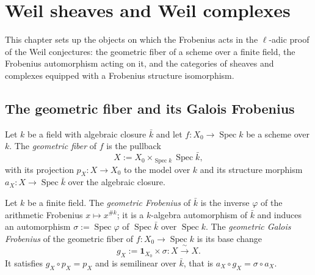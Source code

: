 \chapter{Weil sheaves and Weil complexes}\label{chap:weil-sheaves}

This chapter sets up the objects on which the Frobenius acts in the \(\ell\)-adic
proof of the Weil conjectures: the geometric fiber of a scheme over a finite
field, the Frobenius automorphism acting on it, and the categories of sheaves and
complexes equipped with a Frobenius structure isomorphism.

\section{The geometric fiber and its Galois Frobenius}

\begin{definition}\label{def:weil-geometric-fiber}
\leanok
Let \(k\) be a field with algebraic closure \(\bar k\) and let \(f\colon X_0\to
\operatorname{Spec}k\) be a scheme over \(k\).  The \emph{geometric fiber} of
\(f\) is the pullback
\[
 X:=X_0\times_{\operatorname{Spec}k}\operatorname{Spec}\bar k,
\]
with its projection \(p_X\colon X\to X_0\) to the model over \(k\) and its
structure morphism \(a_X\colon X\to\operatorname{Spec}\bar k\) over the algebraic
closure.
\end{definition}

\begin{definition}\label{def:weil-galois-frobenius}
\leanok
Let \(k\) be a finite field.  The \emph{geometric Frobenius} of \(\bar k\) is the
inverse \(\varphi\) of the arithmetic Frobenius \(x\mapsto x^{\#k}\); it is a
\(k\)-algebra automorphism of \(\bar k\) and induces an automorphism
\(\sigma:=\operatorname{Spec}\varphi\) of \(\operatorname{Spec}\bar k\) over
\(\operatorname{Spec}k\).  The \emph{geometric Galois Frobenius} of the geometric
fiber of \(f\colon X_0\to\operatorname{Spec}k\) is its base change
\[
 g_X:=\mathbf 1_{X_0}\times\sigma\colon X\xrightarrow{\ \sim\ }X.
\]
It satisfies \(g_X\circ p_X=p_X\) and is semilinear over \(\bar k\), that is
\(a_X\circ g_X=\sigma\circ a_X\).
\end{definition}

